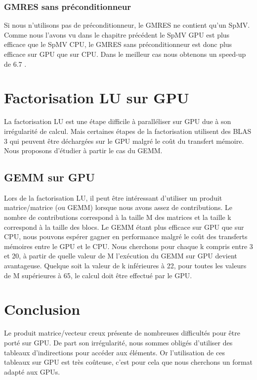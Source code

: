 \documentclass[a4paper,11pt]{report}
\begin{document}
  \subsection{GMRES sans préconditionneur}
   Si nous n'utilisons pas de préconditionneur, le GMRES ne contient
   qu'un SpMV.
   Comme nous l'avons vu dans le chapitre précédent le SpMV GPU est
   plus efficace que le SpMV CPU, le GMRES sans préconditionneur est
   donc plus efficace sur GPU que sur CPU. Dans le
   meilleur cas nous obtenons un speed-up de 6.7 .


\chapter{Factorisation LU sur GPU}
 La factorisation LU est une étape difficile à paralléliser sur GPU
 due à son irrégularité de calcul. Mais certaines étapes de la
 factorisation utilisent des BLAS 3 qui peuvent être déchargées sur le
 GPU malgré le coût du transfert mémoire. Nous proposons d'étudier à
 partir le cas du GEMM.
 
 \section{GEMM sur GPU}
  Lors de la factorisation LU, il peut être intéressant d'utiliser un
  produit matrice/matrice (ou GEMM) lorsque nous avons assez de
  contributions. Le nombre de contributions correspond à la taille M des
  matrices et la taille k correspond à la taille des blocs.
  Le GEMM étant plus efficace sur GPU que sur CPU, nous pouvons espérer
  gagner en performance malgré le
  coût des transferts mémoires entre le GPU et le CPU.
  Nous cherchons pour chaque k compris entre 3 et 20, à partir de
  quelle valeur de M l'exécution du GEMM sur GPU devient avantageuse.
  Quelque soit la valeur de k inférieures à 22, pour toutes les valeurs
  de M supérieures à 65, le calcul doit être effectué par le GPU.

\chapter{Conclusion}
 Le produit matrice/vecteur creux présente de nombreuses difficultés
 pour être porté sur GPU. De part son irrégularité, nous sommes
 obligés d'utiliser des tableaux d'indirections pour accéder aux
 éléments. Or l'utilisation de ces tableaux sur GPU est très coûteuse,
 c'est pour cela que nous cherchons un format adapté aux GPUs.
\end{document}
